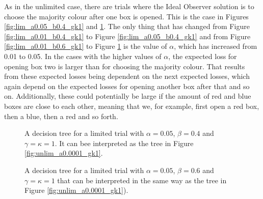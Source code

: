As in the unlimited case, there are trials where the Ideal Observer solution is to choose the majority colour after one box is opened. This is the case in Figures \ref{fig:lim_a0.05_b0.4_gk1} and \ref{fig:lim_a0.05_b0.6_gk1}. The only thing that has changed from Figure \ref{fig:lim_a0.01_b0.4_gk1} to Figure \ref{fig:lim_a0.05_b0.4_gk1} and from Figure \ref{fig:lim_a0.01_b0.6_gk1} to Figure \ref{fig:lim_a0.05_b0.6_gk1} is the value of $\alpha$, which has increased from 0.01 to 0.05. In the cases with the higher values of $\alpha$, the expected loss for opening box two is larger than for choosing the majority colour. That results from these expected losses being dependent on the next expected losses, which again depend on the expected losses for opening another box after that and so on. Additionally, these could potentially be large if the amount of red and blue boxes are close to each other, meaning that we, for example, first open a red box, then a blue, then a red and so forth. 

\begin{figure}
    \centering
    \begin{minipage}[t]{0.45\textwidth} 
        \centering
        \scalebox{0.8}{}
        \caption[IO solution limited. $\alpha=0.05$, $\beta=0.4$ and $\gamma=\kappa=1$.]{A decision tree for a limited trial with $\alpha = 0.05$, $\beta=0.4$ and $\gamma=\kappa=1$. It can bee interpreted as the tree in Figure \ref{fig:unlim_a0.0001_gk1}.}
        \label{fig:lim_a0.05_b0.4_gk1}
    \end{minipage}\hfill
    \begin{minipage}[t]{0.45\textwidth} 
        \centering
        \scalebox{0.8}{}
        \caption[IO solution limited. $\alpha=0.05$, $\beta=0.6$ and $\gamma=\kappa=1$.]{A decision tree for a limited trial with $\alpha = 0.05$, $\beta=0.6$ and $\gamma=\kappa=1$ that can be interpreted in the same way as the tree in Figure \ref{fig:unlim_a0.0001_gk1}).}
        \label{fig:lim_a0.05_b0.6_gk1}
    \end{minipage}
\end{figure}


